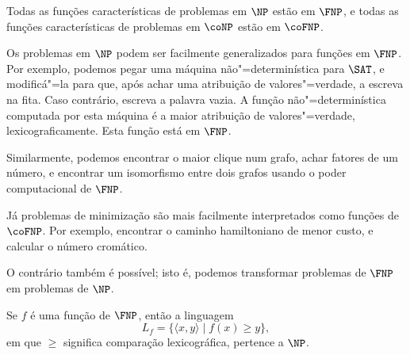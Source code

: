 \begin{uproposition}
    Todas as funções características de problemas em $\NP$ estão em $\FNP$,
    e todas as funções características de problemas em $\coNP$ estão em $\coFNP$.
\end{uproposition}

\begin{example}
    Os problemas em $\NP$ podem ser facilmente generalizados para funções em $\FNP$.
    Por exemplo,
    podemos pegar uma máquina não"=determinística para $\SAT$,
    e modificá"=la para que,
    após achar uma atribuição de valores"=verdade,
    a escreva na fita.
    Caso contrário,
    escreva a palavra vazia.
    A função não"=determinística computada por esta máquina
    é a maior atribuição de valores"=verdade,
    lexicograficamente.
    Esta função está em $\FNP$.

    Similarmente,
    podemos encontrar o maior clique num grafo,
    achar fatores de um número,
    e encontrar um isomorfismo entre dois grafos
    usando o poder computacional de $\FNP$.

    Já problemas de minimização
    são mais facilmente interpretados como funções de $\coFNP$.
    Por exemplo,
    encontrar o caminho hamiltoniano de menor custo,
    e calcular o número cromático.
\end{example}

O contrário também é possível;
isto é,
podemos transformar problemas de $\FNP$ em problemas de $\NP$.

\begin{theorem}
    Se $f$ é uma função de $\FNP$,
    então a linguagem
    \begin{equation*}
        L_f = \{ \langle x, y \rangle \mid f(x) \geq y \},
    \end{equation*}
    em que $\geq$ significa comparação lexicográfica,
    pertence a $\NP$.
    \label{thm:fnp_to_np_conversion}
\end{theorem}

